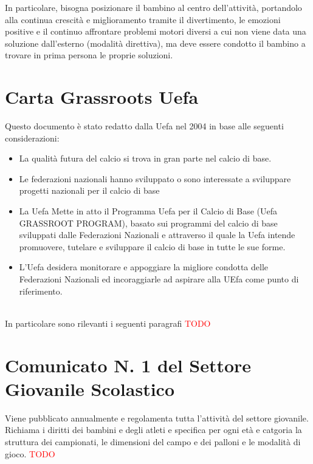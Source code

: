 \documentclass[../uefaC.tex]{subfiles}
\begin{document}
In particolare, bisogna posizionare il bambino al centro dell'attività, portandolo alla continua crescità e miglioramento tramite il divertimento, le emozioni positive e il continuo affrontare problemi motori diversi a cui non viene data una soluzione dall'esterno (modalità direttiva), ma deve essere condotto il bambino a trovare in prima persona le proprie soluzioni.

\section{Carta Grassroots Uefa}
Questo documento è stato redatto dalla Uefa nel 2004 in base alle seguenti considerazioni: \hfill \\
\begin{itemize}
    \item{La qualità futura del calcio si trova in gran parte nel calcio di base.}
    \item{Le federazioni nazionali hanno sviluppato o sono interessate a sviluppare progetti nazionali per il calcio di base}
    \item{La Uefa Mette in atto il Programma Uefa per il Calcio di Base (Uefa GRASSROOT PROGRAM), basato sui programmi del calcio di base sviluppati dalle Federazioni Nazionali e attraverso il quale la Uefa intende promuovere, tutelare e sviluppare il calcio di base in tutte le sue forme.}
    \item{L'Uefa desidera monitorare e appoggiare la migliore condotta delle Federazioni Nazionali ed incoraggiarle ad aspirare alla UEfa come punto di riferimento.}
\end{itemize}
\hfill \\
In particolare sono rilevanti i seguenti paragrafi \textcolor{red}{TODO}


\section{Comunicato N. 1 del Settore Giovanile Scolastico}

Viene pubblicato annualmente e regolamenta tutta l'attività del settore giovanile. Richiama i diritti dei bambini e degli atleti e specifica per ogni età e catgoria la struttura dei campionati, le dimensioni del campo e dei palloni e le modalità di gioco. \textcolor{red}{TODO}
\end{document}
